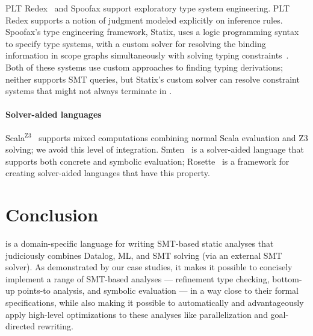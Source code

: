 \documentclass[acmsmall,screen,nonacm]{acmart}
\theoremstyle{definition}
\begin{document}
PLT Redex~\cite{Felleisen:2009:SEP:1795772} and Spoofax
\cite{Kats:2010:SLW:1869459.1869497} support exploratory type system
engineering.
%
PLT Redex supports a notion of judgment modeled explicitly on inference rules.
%
Spoofax's type engineering framework, Statix, uses a logic programming syntax
to specify type systems, with a custom solver for resolving the binding
information in scope graphs simultaneously with solving typing
constraints~\cite{vanAntwerpen:2018:ST:3288538.3276484}.
%
Both of these systems use custom approaches to finding typing derivations;
neither supports SMT queries, but Statix's custom solver can resolve constraint
systems that might not always terminate in \Name.

\paragraph{Solver-aided languages}

Scala${^\text{Z3}}$~\citep{scalaz3} supports mixed computations combining
normal Scala evaluation and Z3 solving; we avoid this level of integration.
Smten~\citep{smten} is a solver-aided language that supports both concrete and
symbolic evaluation; Rosette~\citep{rosette} is a framework for creating
solver-aided languages that have this property.

\section{Conclusion}\label{sec:conclusion}

\Name is a domain-specific language for writing SMT-based static analyses that
judiciously combines Datalog, ML, and SMT solving (via an external SMT solver).
As demonstrated by our case studies, it makes it possible to concisely
implement a range of SMT-based analyses --- refinement type checking, bottom-up
points-to analysis, and symbolic evaluation --- in a way close to their formal
specifications, while also making it possible to automatically and
advantageously apply high-level optimizations to these analyses like
parallelization and goal-directed rewriting.
\end{document}

